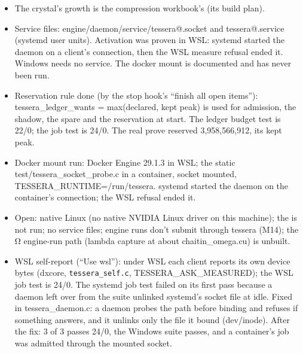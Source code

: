 \begin{enumerate}
\begin{itemize}
\begin{itemize}
\item Fixed: PATH\_\allowbreak{}MAX via linux/limits.h; \_\allowbreak{}GNU\_\allowbreak{}SOURCE in the measure; the timer's return; ENGINE\_\allowbreak{}NOINLINE\_\allowbreak{}HELPER; platform strings guarded; the daemon uses its string table, and the ticket names its signum.
\item WSL's NVML lists no process's memory; tessera\_\allowbreak{}measure\_\allowbreak{}paravirtual refuses, and the daemon exits. The suite passes with 0 warnings.
\item Native Linux is not available here.
\end{itemize}
\item The crystal's growth is the compression workbook's (its build plan).
\item Service files: engine/daemon/service/tessera@.socket and tessera@.service (systemd user units). Activation was proven in WSL: systemd started the daemon on a client's connection, then the WSL measure refusal ended it. Windows needs no service. The docker mount is documented and has never been run.
\item Reservation rule done (by the stop hook's “finish all open items”): tessera\_\allowbreak{}ledger\_\allowbreak{}wants = max(declared, kept peak) is used for admission, the shadow, the spare and the reservation at start. The ledger budget test is 22/0; the job test is 24/0. The real prove reserved 3,958,566,912, its kept peak.
\item Docker mount run: Docker Engine 29.1.3 in WSL; the static test/tessera\_\allowbreak{}socket\_\allowbreak{}probe.c in a container, socket mounted, TESSERA\_\allowbreak{}RUNTIME=/run/tessera. systemd started the daemon on the container's connection; the WSL refusal ended it.
\item Open: native Linux (no native NVIDIA Linux driver on this machine); the is not run; no service files; engine runs don't submit through tessera (M14); the Ω engine-run path (lambda capture at about chaitin\_\allowbreak{}omega.cu) is unbuilt.
\item WSL self-report (“Use wsl”): under WSL each client reports its own device bytes (dxcore, \texttt{tessera\_\allowbreak{}self.\allowbreak{}c}, TESSERA\_\allowbreak{}ASK\_\allowbreak{}MEASURED); the WSL job test is 24/0. The systemd job test failed on its first pass because a daemon left over from the suite unlinked systemd's socket file at idle. Fixed in tessera\_\allowbreak{}daemon.c: a daemon probes the path before binding and refuses if something answers, and it unlinks only the file it bound (dev/inode). After the fix: 3 of 3 passes 24/0, the Windows suite passes, and a container's job was admitted through the mounted socket.

\end{itemize}
\end{enumerate}
